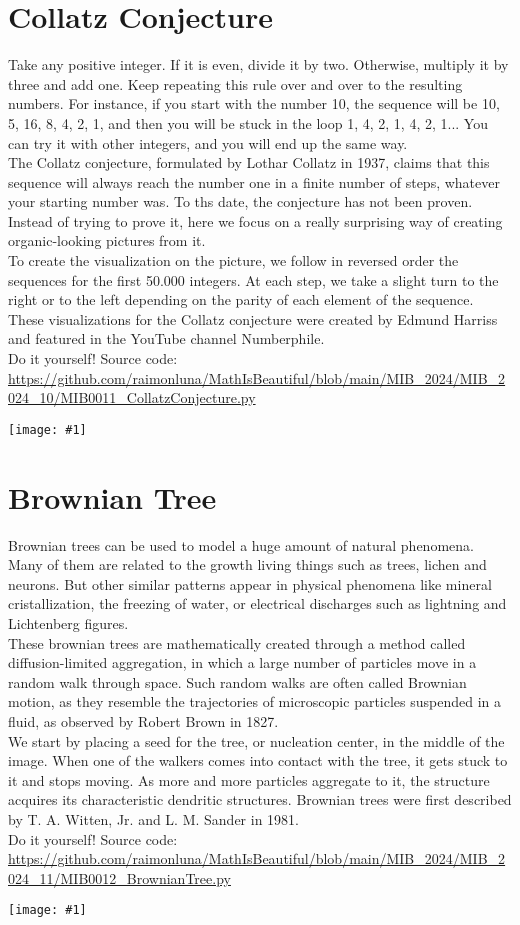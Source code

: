 \documentclass[12pt,landscape]{article}
\newcommand{\artpage}[3][]{%
  \begin{minipage}[t]{0.48\linewidth}
    \vspace{0pt} %
    \section*{#2} %
    \addcontentsline{toc}{section}{#2} %
    #3 %
  \end{minipage}%
  \hfill
  \begin{minipage}[t]{0.48\linewidth}
    \vspace{0pt} %
    \centering
    \texttt{[image: \#1]}
  \end{minipage}%
  \newpage
}
\begin{document}
\artpage[../Output/LowQuality/MIB0011_CollatzConjecture.png]{Collatz Conjecture}{%
Take any positive integer. If it is even, divide it by two. Otherwise, multiply it by three and add one. Keep repeating this rule over and over to the resulting numbers. For instance, if you start with the number 10, the sequence will be 10, 5, 16, 8, 4, 2, 1, and then you will be stuck in the loop 1, 4, 2, 1, 4, 2, 1... You can try it with other integers, and you will end up the same way.\\

The Collatz conjecture, formulated by Lothar Collatz in 1937, claims that this sequence will always reach the number one in a finite number of steps, whatever your starting number was. To ths date, the conjecture has not been proven. Instead of trying to prove it, here we focus on a really surprising way of creating organic-looking pictures from it.\\

To create the visualization on the picture, we follow in reversed order the sequences for the first 50.000 integers. At each step, we take a slight turn to the right or to the left depending on the parity of each element of the sequence. These visualizations for the Collatz conjecture were created by Edmund Harriss and featured in the YouTube channel Numberphile.\\

Do it yourself! Source code: \url{https://github.com/raimonluna/MathIsBeautiful/blob/main/MIB_2024/MIB_2024_10/MIB0011_CollatzConjecture.py}
}

\artpage[../Output/LowQuality/MIB0012_BrownianTree.png]{Brownian Tree}{%
Brownian trees can be used to model a huge amount of natural phenomena. Many of them are related to the growth living things such as trees, lichen and neurons. But other similar patterns appear in physical phenomena like mineral cristallization, the freezing of water, or electrical discharges such as lightning and Lichtenberg figures.\\

These brownian trees are mathematically created through a method called diffusion-limited aggregation, in which a large number of particles move in a random walk through space. Such random walks are often called Brownian motion, as they resemble the trajectories of microscopic particles suspended in a fluid, as observed by Robert Brown in 1827.\\

We start by placing a seed for the tree, or nucleation center, in the middle of the image. When one of the walkers comes into contact with the tree, it gets stuck to it and stops moving. As more and more particles aggregate to it, the structure acquires its characteristic dendritic structures. Brownian trees were first described by T. A. Witten, Jr. and L. M. Sander in 1981.\\

Do it yourself! Source code: \url{https://github.com/raimonluna/MathIsBeautiful/blob/main/MIB_2024/MIB_2024_11/MIB0012_BrownianTree.py}
}
\end{document}
